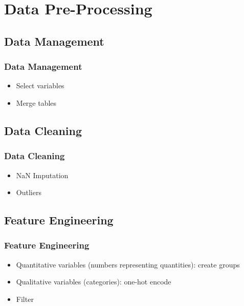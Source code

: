 \section{Data Pre-Processing}


\subsection{Data Management}

\begin{frame}\frametitle{Data Management}
   \begin{itemize}
      \item Select variables
      \item Merge tables
   \end{itemize}
\end{frame}


\subsection{Data Cleaning}

\begin{frame}\frametitle{Data Cleaning}
   \begin{itemize}
      \item NaN Imputation
      \item Outliers
   \end{itemize}
\end{frame}


\subsection{Feature Engineering}

\begin{frame}\frametitle{Feature Engineering}
   \begin{itemize}
      \item Quantitative variables (numbers representing quantities): create groups
      \item Qualitative variables (categories): one-hot encode
      \item Filter
   \end{itemize}
\end{frame}


